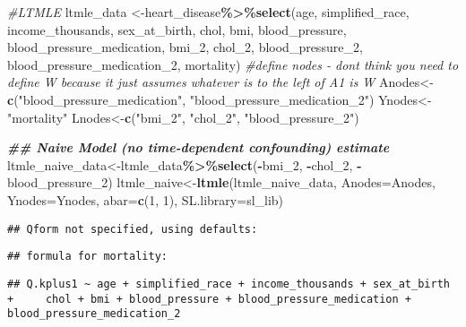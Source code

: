 \documentclass[
]{article}
\newenvironment{Shaded}{\begin{snugshade}}{\end{snugshade}}
\newcommand{\AttributeTok}[1]{\textcolor[rgb]{0.13,0.29,0.53}{#1}}
\newcommand{\CommentTok}[1]{\textcolor[rgb]{0.56,0.35,0.01}{\textit{#1}}}
\newcommand{\DecValTok}[1]{\textcolor[rgb]{0.00,0.00,0.81}{#1}}
\newcommand{\DocumentationTok}[1]{\textcolor[rgb]{0.56,0.35,0.01}{\textbf{\textit{#1}}}}
\newcommand{\FunctionTok}[1]{\textcolor[rgb]{0.13,0.29,0.53}{\textbf{#1}}}
\newcommand{\NormalTok}[1]{#1}
\newcommand{\OtherTok}[1]{\textcolor[rgb]{0.56,0.35,0.01}{#1}}
\newcommand{\SpecialCharTok}[1]{\textcolor[rgb]{0.81,0.36,0.00}{\textbf{#1}}}
\newcommand{\StringTok}[1]{\textcolor[rgb]{0.31,0.60,0.02}{#1}}
\begin{document}
\begin{Shaded}
\begin{Highlighting}[]
\CommentTok{\#LTMLE}
\NormalTok{ltmle\_data }\OtherTok{\textless{}{-}}\NormalTok{heart\_disease}\SpecialCharTok{\%\textgreater{}\%}\FunctionTok{select}\NormalTok{(age, simplified\_race, income\_thousands, sex\_at\_birth, chol, bmi, blood\_pressure, blood\_pressure\_medication, bmi\_2, chol\_2, blood\_pressure\_2, blood\_pressure\_medication\_2, mortality)}
\CommentTok{\#define nodes {-} don\textquotesingle{}t think you need to define W because it just assumes whatever is to the left of A1 is W}
\NormalTok{Anodes}\OtherTok{\textless{}{-}}\FunctionTok{c}\NormalTok{(}\StringTok{"blood\_pressure\_medication"}\NormalTok{, }\StringTok{"blood\_pressure\_medication\_2"}\NormalTok{)}
\NormalTok{Ynodes}\OtherTok{\textless{}{-}}\StringTok{"mortality"}
\NormalTok{Lnodes}\OtherTok{\textless{}{-}}\FunctionTok{c}\NormalTok{(}\StringTok{"bmi\_2"}\NormalTok{, }\StringTok{"chol\_2"}\NormalTok{, }\StringTok{"blood\_pressure\_2"}\NormalTok{)}

\DocumentationTok{\#\# Naive Model (no time{-}dependent confounding) estimate}
\NormalTok{ltmle\_naive\_data}\OtherTok{\textless{}{-}}\NormalTok{ltmle\_data}\SpecialCharTok{\%\textgreater{}\%}\FunctionTok{select}\NormalTok{(}\SpecialCharTok{{-}}\NormalTok{bmi\_2, }\SpecialCharTok{{-}}\NormalTok{chol\_2, }\SpecialCharTok{{-}}\NormalTok{blood\_pressure\_2)}
\NormalTok{ltmle\_naive}\OtherTok{\textless{}{-}}\FunctionTok{ltmle}\NormalTok{(ltmle\_naive\_data, }\AttributeTok{Anodes=}\NormalTok{Anodes, }\AttributeTok{Ynodes=}\NormalTok{Ynodes, }\AttributeTok{abar=}\FunctionTok{c}\NormalTok{(}\DecValTok{1}\NormalTok{, }\DecValTok{1}\NormalTok{), }\AttributeTok{SL.library=}\NormalTok{sl\_lib)}
\end{Highlighting}
\end{Shaded}

\begin{verbatim}
## Qform not specified, using defaults:
\end{verbatim}

\begin{verbatim}
## formula for mortality:
\end{verbatim}

\begin{verbatim}
## Q.kplus1 ~ age + simplified_race + income_thousands + sex_at_birth +     chol + bmi + blood_pressure + blood_pressure_medication +     blood_pressure_medication_2
\end{verbatim}
\end{document}
